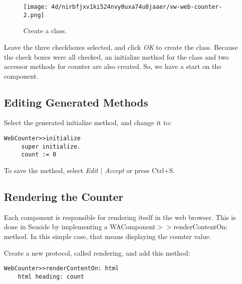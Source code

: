\documentclass[a4paper,10pt,twoside]{book}
\newcommand{\ct}[1]{{\small\ttfamily\textup{#1}}}
\begin{document}
\begin{figure}[h!tbp]
	\begin{center}
		\texttt{[image: 4d/nirbfjxv1ki524nvy0uxa74u8jaaer/vw-web-counter-2.png]}
		\caption{Create a class.\label{book:gettingstarted:cincomsmalltalk:component:component:createclass}}
	\end{center}
\end{figure}


Leave the three checkboxes selected, and click \textit{OK} to create the class. Because the check boxes were all checked, an initialize method for the class and two accessor methods for counter are also created. So, we have a start on the component.

\subsection{Editing Generated Methods}
\label{book:gettingstarted:cincomsmalltalk:component:generatedmethods}

Select the generated initialize method, and change it to:

\begin{lstlisting}
WebCounter>>initialize 
     super initialize. 
     count := 0
\end{lstlisting}

To save the method, select \textit{Edit $|$ Accept} or press Ctrl+S.

\subsection{Rendering the Counter}
\label{book:gettingstarted:cincomsmalltalk:component:rendering}

Each component is responsible for rendering itself in the web browser. This is done in Seaside by implementing a  \ct{WAComponent$>$$>$renderContentOn:} method. In this simple case, that means displaying the counter value. 

Create a new protocol, called rendering, and add this method:

\begin{lstlisting}
WebCounter>>renderContentOn: html 
    html heading: count
\end{lstlisting}
\end{document}

